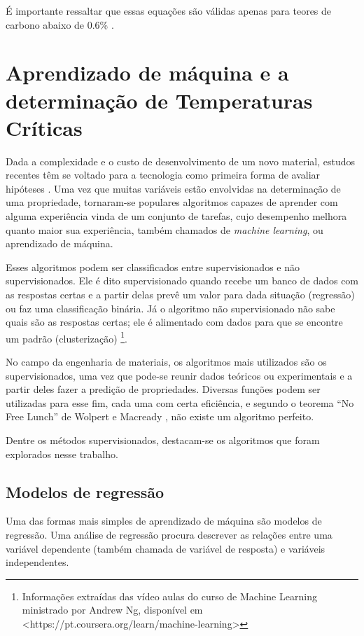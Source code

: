 \documentclass[brazil,tf,epusp]{usp}  %
\begin{document}
É importante ressaltar que essas equações são válidas apenas para teores de carbono abaixo de 0.6\% \cite{ANDREWS1965}.

\section{Aprendizado de m\'aquina e a determinação de Temperaturas Cr\'iticas}

Dada a complexidade e o custo de desenvolvimento de um novo material, estudos recentes têm se voltado para a tecnologia como primeira forma de avaliar hipóteses \cite{Belisle2015}. Uma vez que muitas variáveis estão envolvidas na determinação de uma propriedade, tornaram-se populares algoritmos capazes de aprender com alguma experiência vinda de um conjunto de tarefas, cujo desempenho melhora quanto maior sua experiência, também chamados de \textit{machine learning}, ou aprendizado de máquina.

Esses algoritmos podem ser classificados entre supervisionados e não supervisionados. Ele é dito supervisionado quando recebe um banco de dados com as respostas certas e a partir delas prevê um valor para dada situação (regressão) ou faz uma classificação binária. Já o algoritmo não supervisionado não sabe quais são as respostas certas; ele é alimentado com dados para que se encontre um padrão (clusterização) \footnote{Informações extraídas das vídeo aulas do curso de Machine Learning ministrado por Andrew Ng, disponível em <https://pt.coursera.org/learn/machine-learning>}.

No campo da engenharia de materiais, os algoritmos mais utilizados são os supervisionados, uma vez que pode-se reunir dados teóricos ou experimentais e a partir deles fazer a predição de propriedades. Diversas funções podem ser utilizadas para esse fim, cada uma com certa eficiência, e segundo o teorema ``No Free Lunch'' de Wolpert e Macready  , não existe um algoritmo perfeito.

Dentre os métodos supervisionados, destacam-se os algoritmos que foram explorados nesse trabalho.

\subsection{Modelos de regress\~ao}
Uma das formas mais simples de aprendizado de máquina são modelos de regressão. Uma análise de regressão procura descrever as relações entre uma variável dependente (também chamada de variável de resposta) e variáveis independentes.
\end{document}
